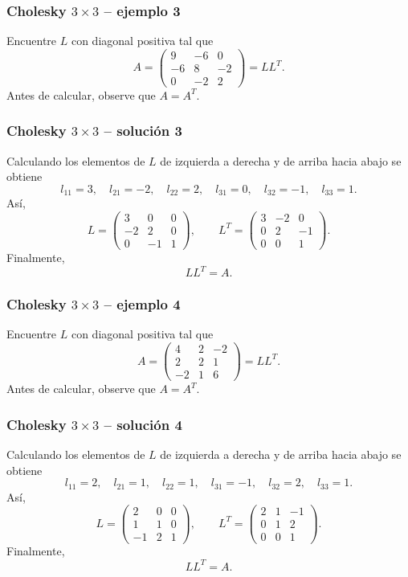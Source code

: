 \subsubsection*{Cholesky $3\times 3$ -- ejemplo 3}

Encuentre $L$ con diagonal positiva tal que
\[
A=\begin{pmatrix}9 & -6 & 0\\-6 & 8 & -2\\0 & -2 & 2\end{pmatrix}=LL^T.
\]
Antes de calcular, observe que $A=A^T$.


\subsubsection*{Cholesky $3\times 3$ -- solución 3}

Calculando los elementos de $L$ de izquierda a derecha y de arriba hacia abajo se obtiene
\[
l_{11}=3,\quad l_{21}=-2,\quad l_{22}=2,\quad l_{31}=0,\quad l_{32}=-1,\quad l_{33}=1.
\]
Así,
\[
L=\begin{pmatrix}3 & 0 & 0\\-2 & 2 & 0\\0 & -1 & 1\end{pmatrix},\qquad L^T=\begin{pmatrix}3 & -2 & 0\\0 & 2 & -1\\0 & 0 & 1\end{pmatrix}.
\]
Finalmente,
\[
\boxed{LL^T=A}.
\]


\subsubsection*{Cholesky $3\times 3$ -- ejemplo 4}

Encuentre $L$ con diagonal positiva tal que
\[
A=\begin{pmatrix}4 & 2 & -2\\2 & 2 & 1\\-2 & 1 & 6\end{pmatrix}=LL^T.
\]
Antes de calcular, observe que $A=A^T$.


\subsubsection*{Cholesky $3\times 3$ -- solución 4}

Calculando los elementos de $L$ de izquierda a derecha y de arriba hacia abajo se obtiene
\[
l_{11}=2,\quad l_{21}=1,\quad l_{22}=1,\quad l_{31}=-1,\quad l_{32}=2,\quad l_{33}=1.
\]
Así,
\[
L=\begin{pmatrix}2 & 0 & 0\\1 & 1 & 0\\-1 & 2 & 1\end{pmatrix},\qquad L^T=\begin{pmatrix}2 & 1 & -1\\0 & 1 & 2\\0 & 0 & 1\end{pmatrix}.
\]
Finalmente,
\[
\boxed{LL^T=A}.
\]


